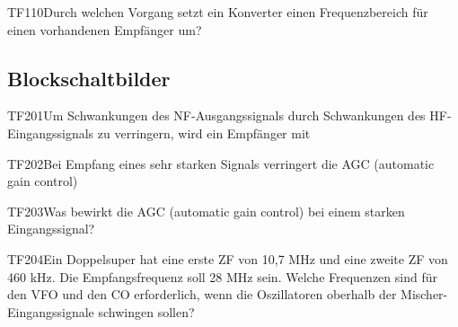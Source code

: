 \begin{question}{TF110}{Durch welchen Vorgang setzt ein Konverter einen Frequenzbereich für einen vorhandenen Empfänger um?}
\end{question}

\subsection{Blockschaltbilder}

\begin{question}{TF201}{Um Schwankungen des NF-Ausgangssignals durch Schwankungen des HF-Eingangssignals zu verringern, wird ein Empfänger mit}
\end{question}

\begin{question}{TF202}{Bei Empfang eines sehr starken Signals verringert die AGC (automatic gain control)}
\end{question}

\begin{question}{TF203}{Was bewirkt die AGC (automatic gain control) bei einem starken Eingangssignal?}
\end{question}

\begin{question}{TF204}{Ein Doppelsuper hat eine erste ZF von 10,7 MHz und eine zweite ZF von 460 kHz. Die Empfangsfrequenz soll 28 MHz sein. Welche Frequenzen sind für den VFO und den CO erforderlich, wenn die Oszillatoren oberhalb der Mischer-Eingangssignale schwingen sollen?}
\end{question}

